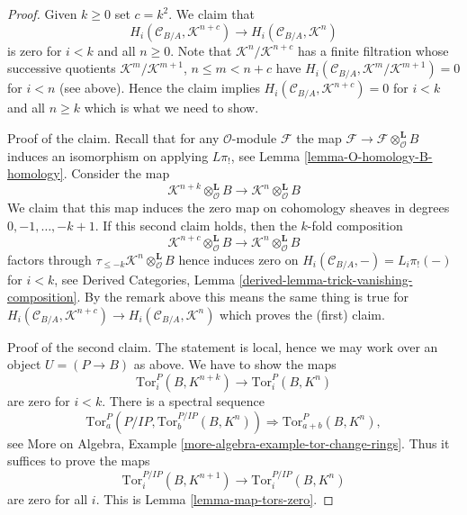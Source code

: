 \begin{proof}
\medskip\noindent
Given $k \geq 0$ set $c = k^2$. We claim that
$$
H_i(\mathcal{C}_{B/A}, \mathcal{K}^{n + c}) \to
H_i(\mathcal{C}_{B/A}, \mathcal{K}^n)
$$
is zero for $i < k$ and all $n \geq 0$. Note that
$\mathcal{K}^n/\mathcal{K}^{n + c}$ has a finite filtration whose successive
quotients $\mathcal{K}^m/\mathcal{K}^{m + 1}$, $n \leq m < n + c$
have $H_i(\mathcal{C}_{B/A}, \mathcal{K}^m/\mathcal{K}^{m + 1}) = 0$
for $i < n$ (see above). Hence the claim implies
$H_i(\mathcal{C}_{B/A}, \mathcal{K}^{n + c}) = 0$ for $i < k$ and all
$n \geq k$ which is what we need to show.

\medskip\noindent
Proof of the claim. Recall that for any $\mathcal{O}$-module $\mathcal{F}$
the map $\mathcal{F} \to \mathcal{F} \otimes_\mathcal{O}^\mathbf{L} B$
induces an isomorphism on applying $L\pi_!$, see
Lemma \ref{lemma-O-homology-B-homology}.
Consider the map
$$
\mathcal{K}^{n + k} \otimes_\mathcal{O}^\mathbf{L} B
\longrightarrow
\mathcal{K}^n \otimes_\mathcal{O}^\mathbf{L} B
$$
We claim that this map induces the zero map on cohomology sheaves
in degrees $0, -1, \ldots, - k + 1$. If this second claim holds, then
the $k$-fold composition
$$
\mathcal{K}^{n + c} \otimes_\mathcal{O}^\mathbf{L} B
\longrightarrow
\mathcal{K}^n \otimes_\mathcal{O}^\mathbf{L} B
$$
factors through $\tau_{\leq -k}\mathcal{K}^n \otimes_\mathcal{O}^\mathbf{L} B$
hence induces zero on $H_i(\mathcal{C}_{B/A}, -) = L_i\pi_!( - )$
for $i < k$, see
Derived Categories, Lemma \ref{derived-lemma-trick-vanishing-composition}.
By the remark above this means the same thing is true for
$H_i(\mathcal{C}_{B/A}, \mathcal{K}^{n + c}) \to
H_i(\mathcal{C}_{B/A}, \mathcal{K}^n)$
which proves the (first) claim.

\medskip\noindent
Proof of the second claim. The statement is local, hence we may work
over an object $U = (P \to B)$ as above. We have to show
the maps
$$
\text{Tor}_i^P(B, K^{n + k}) \to \text{Tor}_i^P(B, K^n)
$$
are zero for $i < k$. There is a spectral sequence
$$
\text{Tor}_a^P(P/IP, \text{Tor}_b^{P/IP}(B, K^n))
\Rightarrow
\text{Tor}_{a + b}^P(B, K^n),
$$
see More on Algebra, Example \ref{more-algebra-example-tor-change-rings}.
Thus it suffices to prove the maps
$$
\text{Tor}_i^{P/IP}(B, K^{n + 1}) \to \text{Tor}_i^{P/IP}(B, K^n)
$$
are zero for all $i$. This is Lemma \ref{lemma-map-tors-zero}.
\end{proof}

